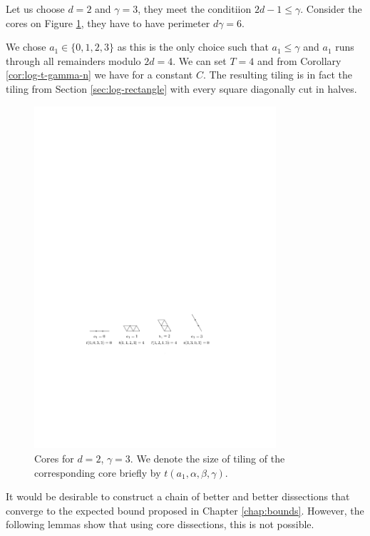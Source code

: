 \begin{exmp}
Let us choose $d=2$ and $\gamma=3$, they meet the conditiion $2d-1 \leq \gamma$. Consider the cores on Figure \ref{fig:core-kk3}, they have to have perimeter $d\gamma = 6$.

We chose $a_1 \in \{0,1,2,3\}$ as this is the only choice such that $a_1 \leq \gamma$ and $a_1$ runs through all remainders modulo $2d=4$. We can set $T=4$ and from Corollary \ref{cor:log-t-gamma-n} we have
%
for a constant $C$. The resulting tiling is in fact the tiling from Section \ref{sec:log-rectangle}  with every square diagonally cut in halves.

\begin{figure}[htb]
\centering
\includegraphics[width=0.8\textwidth]{img/example_core_kk3.pdf}
\caption{Cores for $d=2$, $\gamma=3$. We denote the size of tiling of the corresponding core briefly by $t(a_1,\alpha,\beta,\gamma)$.}
\label{fig:core-kk3}
\end{figure}
\end{exmp}%

It would be desirable to construct a chain of better and better dissections that converge to the expected bound proposed in Chapter \ref{chap:bounds}. However, the following lemmas show that using core dissections, this is not possible.

